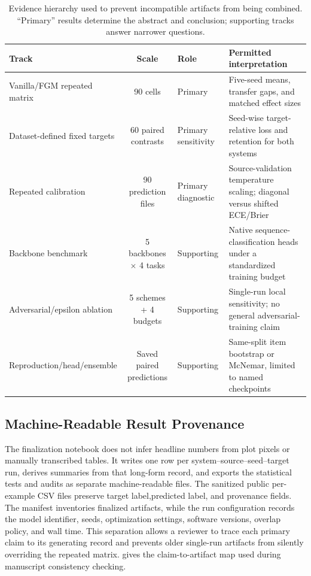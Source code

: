 \documentclass{ieeeaccess}
\begin{document}
\begin{table}[!t]
\centering
\caption{Evidence hierarchy used to prevent incompatible artifacts from being combined. ``Primary'' results determine the abstract and conclusion; supporting tracks answer narrower questions.}
\label{tab:evidence-hierarchy}
\footnotesize
\setlength{\tabcolsep}{4pt}
\begin{tabularx}{\textwidth}{@{}lclX@{}}
\toprule
\textbf{Track} & \textbf{Scale} & \textbf{Role} & \textbf{Permitted interpretation} \\
\midrule
Vanilla/FGM repeated matrix & 90 cells & Primary & Five-seed means, transfer gaps, and matched effect sizes \\
Dataset-defined fixed targets & 60 paired contrasts & Primary sensitivity & Seed-wise target-relative loss and retention for both systems \\
Repeated calibration & 90 prediction files & Primary diagnostic & Source-validation temperature scaling; diagonal versus shifted ECE/Brier \\
Backbone benchmark & 5 backbones $\times$ 4 tasks & Supporting &
Native sequence-classification heads under a standardized training budget \\
Adversarial/epsilon ablation & 5 schemes + 4 budgets & Supporting & Single-run local sensitivity; no general adversarial-training claim \\
Reproduction/head/ensemble & Saved paired predictions & Supporting & Same-split item bootstrap or McNemar, limited to named checkpoints \\
\bottomrule
\end{tabularx}
\end{table}

\subsection{Machine-Readable Result Provenance}
\label{sec:result-provenance}

The finalization notebook does not infer headline numbers from plot pixels or manually transcribed tables. It writes one row per system--source--seed--target run, derives summaries from that long-form record, and exports the statistical tests and audits as separate machine-readable files. The sanitized public per-example CSV files preserve target label,predicted label, and provenance fields. The manifest inventories finalized artifacts, while the run configuration records the model identifier, seeds, optimization settings, software versions, overlap policy, and wall time. This separation allows a reviewer to trace each primary claim to its generating record and prevents older single-run artifacts from silently overriding the repeated matrix.  gives the claim-to-artifact map used during manuscript consistency checking.
\end{document}
